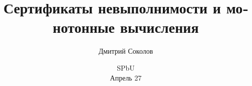 
\setdefaultlanguage[spelling = modern]{russian}

\titlegraphic{
    
}


\title[Невыполнимость и монотонность]{
    Сертификаты невыполнимости и монотонные вычисления
}

\author{
    Дмитрий Соколов
}  


\date{SPbU\\ Апрель 27}

\newcommand{\SPCR}{\PrSys{S}\text{-}\PrSys{PCR}}
\newcommand{\SSOS}{\PrSys{S}\text{-}\PrSys{SOS}}




    \maketitle

    
    
    
    
    

